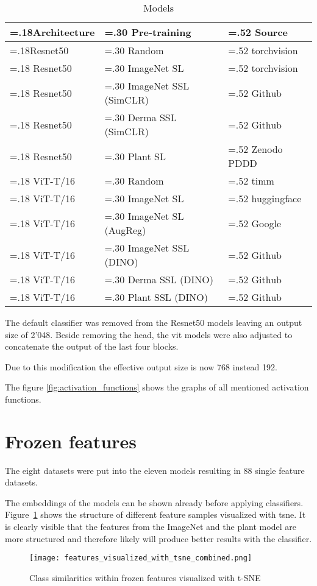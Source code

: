 \begin{table}[H]
\centering
\caption{Models \label{tab:models}}
\begin{tabularx}{\textwidth}{|
    >{\hsize=.18\hsize}X |
    >{\hsize=.30\hsize}X |
    >{\hsize=.52\hsize}X |
}
\hline
\textbf{Architecture} & \textbf{Pre-training} & \textbf{Source} \tabularnewline \hline
Resnet50 & Random & torchvision \tabularnewline \hline
Resnet50 & ImageNet SL & torchvision \tabularnewline \hline
Resnet50 & ImageNet SSL (SimCLR) & Github \autocite{groeger2022} \tabularnewline \hline
Resnet50 & Derma SSL (SimCLR) & Github \autocite{groeger2022} \tabularnewline \hline
Resnet50 & Plant SL & Zenodo PDDD \autocite{zenodo2023} \tabularnewline \hline
ViT-T/16 & Random & timm \tabularnewline \hline
ViT-T/16 & ImageNet SL & huggingface \autocite{winkawaks2022} \tabularnewline \hline
ViT-T/16 & ImageNet SL (AugReg) & Google \autocite{google2024} \tabularnewline \hline
ViT-T/16 & ImageNet SSL (DINO) & Github \autocite{groeger2022} \tabularnewline \hline
ViT-T/16 & Derma SSL (DINO) & Github \autocite{groeger2022} \tabularnewline \hline
ViT-T/16 & Plant SSL (DINO) & Github \autocite{groeger2022} \tabularnewline \hline
\end{tabularx} 
\end{table}

The default classifier was removed from the Resnet50 models leaving an output size of 2'048.
Beside removing the head, the \gls{vit} models were also adjusted to concatenate the output of the last four blocks. 

Due to this modification the effective output size is now 768 instead 192.

The figure \ref{fig:activation_functions} shows the graphs of all mentioned activation functions.


\section{Frozen features}
The eight datasets were put into the eleven models resulting in 88 single feature datasets.

The embeddings of the models can be shown already before applying classifiers.
Figure~\ref{fig:features_visualized_with_tsne_combined} shows the structure of different feature samples visualized with \gls{tsne}.
It is clearly visible that the features from the ImageNet and the plant model are more structured and therefore likely will produce better results with the classifier. 

\begin{figure}[H]
    \begin{center}
    \texttt{[image: features\_visualized\_with\_tsne\_combined.png]}
    \caption{Class similarities within frozen features visualized with t-SNE}\label{fig:features_visualized_with_tsne_combined}
    \end{center}
\end{figure}
